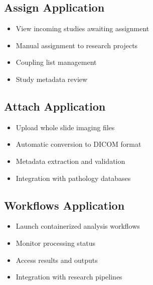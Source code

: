 \documentclass[letterpaper,10pt,english]{sphinxmanual}
\begin{document}
\subsection{Assign Application}
\label{\detokenize{Temp/end-user-options:assign-application}}\begin{itemize}
\item {} 
\sphinxAtStartPar
View incoming studies awaiting assignment

\item {} 
\sphinxAtStartPar
Manual assignment to research projects

\item {} 
\sphinxAtStartPar
Coupling list management

\item {} 
\sphinxAtStartPar
Study metadata review

\end{itemize}


\subsection{Attach Application}
\label{\detokenize{Temp/end-user-options:attach-application}}\begin{itemize}
\item {} 
\sphinxAtStartPar
Upload whole slide imaging files

\item {} 
\sphinxAtStartPar
Automatic conversion to DICOM format

\item {} 
\sphinxAtStartPar
Metadata extraction and validation

\item {} 
\sphinxAtStartPar
Integration with pathology databases

\end{itemize}


\subsection{Workflows Application}
\label{\detokenize{Temp/end-user-options:workflows-application}}\begin{itemize}
\item {} 
\sphinxAtStartPar
Launch containerized analysis workflows

\item {} 
\sphinxAtStartPar
Monitor processing status

\item {} 
\sphinxAtStartPar
Access results and outputs

\item {} 
\sphinxAtStartPar
Integration with research pipelines

\end{itemize}
\end{document}
